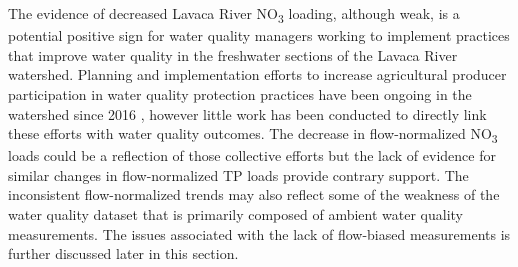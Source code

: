 \documentclass[fleqn,10pt,lineno]{wlpeerj} %
\begin{document}
The evidence of decreased Lavaca River NO\textsubscript{3} loading,
although weak, is a potential positive sign for water quality managers
working to implement practices that improve water quality in the
freshwater sections of the Lavaca River watershed. Planning and
implementation efforts to increase agricultural producer participation
in water quality protection practices have been ongoing in the watershed
since 2016
\autocite{schrammLavacaRiverWatershed2018,bertholdDirectMailingEducation2021},
however little work has been conducted to directly link these efforts
with water quality outcomes. The decrease in flow-normalized
NO\textsubscript{3} loads could be a reflection of those collective
efforts but the lack of evidence for similar changes in flow-normalized
TP loads provide contrary support. The inconsistent flow-normalized
trends may also reflect some of the weakness of the water quality
dataset that is primarily composed of ambient water quality
measurements. The issues associated with the lack of flow-biased
measurements is further discussed later in this section.
\end{document}

